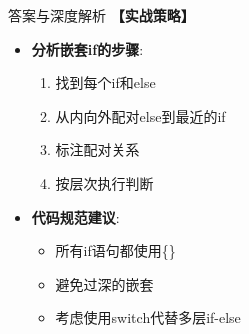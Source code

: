 \documentclass[a4paper,12pt]{article}
\begin{document}
\begin{bluebox}{答案与深度解析}
	\textbf{【实战策略】}
	\begin{itemize}[leftmargin=*, nosep]
		\item \textbf{分析嵌套if的步骤}:
		      \begin{enumerate}
			      \item 找到每个if和else
			      \item 从内向外配对else到最近的if
			      \item 标注配对关系
			      \item 按层次执行判断
		      \end{enumerate}

		\item \textbf{代码规范建议}:
		      \begin{itemize}
			      \item 所有if语句都使用\{\}
			      \item 避免过深的嵌套
			      \item 考虑使用switch代替多层if-else
		      \end{itemize}
	\end{itemize}
\end{bluebox}
\end{document}
